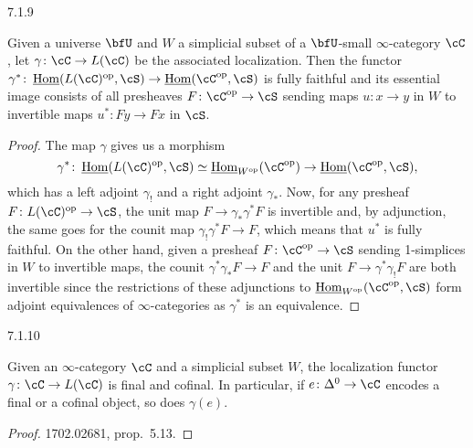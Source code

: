 \documentclass[a4paper,12pt]{scrartcl}
\begin{document}
\begin{prop}
  7.1.9

  Given a universe $\bfU$ and $W$ a simplicial subset of a $\bfU$-small
  $\infty$-category $\cC$, let $\gamma\colon\cC\rightarrow L(\cC)$ be the
  associated localization. Then the functor
  $\gamma^*\colon\Home(L(\cC)^{\op},\cS)\rightarrow\Home(\cC^{\op},\cS)$ is
  fully faithful and its essential image consists of all presheaves
  $F\colon\cC^{\op}\rightarrow\cS$ sending maps $u\colon x\rightarrow y$ in $W$
  to invertible maps $u^*\colon Fy\rightarrow Fx$ in $\cS$.
\end{prop}
\begin{proof}
  The map $\gamma$ gives us a morphism
  \[\gamma^*\colon\Home(L(\cC)^{\op},\cS)\simeq\Home_{W^{\op}}(\cC^{\op})\rightarrow\Home(\cC^{\op},\cS),\]
  which has a left adjoint $\gamma_!$ and a right adjoint $\gamma_*$. Now, for
  any presheaf $F\colon L(\cC)^{\op}\rightarrow\cS$, the unit map
  $F\rightarrow\gamma_*\gamma^*F$ is invertible and, by adjunction, the same
  goes for the counit map $\gamma_!\gamma^*F\rightarrow F$, which means that
  $u^*$ is fully faithful. On the other hand, given a presheaf
  $F\colon\cC^{\op}\rightarrow\cS$ sending 1-simplices in $W$ to invertible maps,
  the counit $\gamma^*\gamma_*F\rightarrow F$ and the unit
  $F\rightarrow\gamma^*\gamma_!F$ are both invertible since the restrictions of
  these adjunctions to $\Home_{W^{\op}}(\cC^{\op},\cS)$ form adjoint
  equivalences of $\infty$-categories as $\gamma^*$ is an equivalence.
\end{proof}

\begin{prop}\label{final}
  7.1.10

  Given an $\infty$-category $\cC$ and a simplicial subset $W$, the localization
  functor $\gamma\colon\cC\rightarrow L(\cC)$ is final and cofinal. In
  particular, if $e\colon\Delta^0\rightarrow\cC$ encodes a final or a cofinal
  object, so does $\gamma(e)$.
\end{prop}
\begin{proof}
  1702.02681, prop.\ 5.13.
\end{proof}
\end{document}
